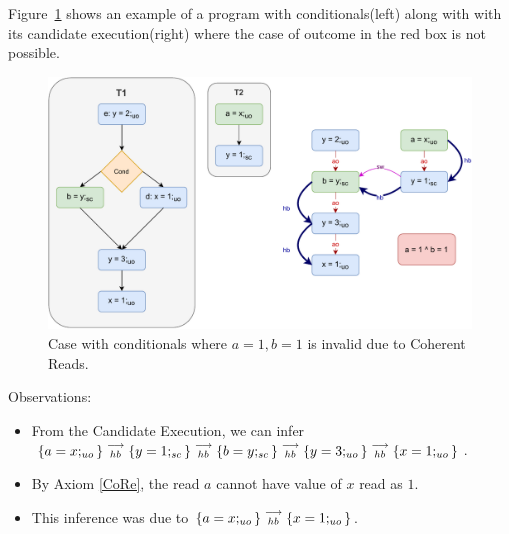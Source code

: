 
    Figure~\ref{reord:cond_counter_example1(a)} shows an example of a program with conditionals(left) along with with its candidate execution(right) where the case of outcome in the red box is not possible. 
    \begin{figure}[H]
        \centering 
        \includegraphics[scale=0.7]{7.CounterExamples/ReorderingConditionals/CounterExamples1a(Conditionals).pdf}
        \caption{Case with conditionals where $a = 1, b = 1$ is invalid due to Coherent Reads.}
        \label{reord:cond_counter_example1(a)}
    \end{figure}
    
    Observations:
    \begin{itemize}
        \item From the Candidate Execution, we can infer $\{a=x;_{uo}\}\stackrel{\longrightarrow}{_{hb}}\{y=1;_{sc}\}\stackrel{\longrightarrow}{_{hb}}\{b=y;_{sc}\}\stackrel{\longrightarrow}{_{hb}}\{y=3;_{uo}\}\stackrel{\longrightarrow}{_{hb}}\{x=1;_{uo}\}$.
        \item By Axiom \ref{CoRe}, the read $a$ cannot have value of $x$ read as $1$. 
        \item This inference was due to $\{a=x;_{uo}\}\stackrel{\longrightarrow}{_{hb}}\{x=1;_{uo}\}$.
    \end{itemize}
    
